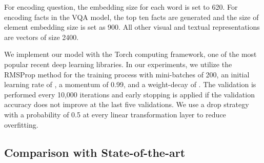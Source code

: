 \documentclass[sigconf]{acmart}
\begin{document}
For encoding question, the embedding size for each word is set to 620. For encoding facts in the VQA model, the top ten facts are generated and the size of element embedding size  is set as 900.  All other visual and textual representations are vectors of size 2400.





We implement our model with the Torch computing framework, one of the most popular recent deep learning libraries. In our experiments, we utilize the RMSProp method for the training process with mini-batches of 200, an initial learning rate of , a momentum of 0.99, and a weight-decay of . The validation is performed every 10,000 iterations and early stopping is applied if the validation accuracy does not improve at the last five validations. We use a drop strategy with a probability of 0.5 at every linear transformation layer to reduce overfitting.


\subsection{Comparison with State-of-the-art}
\end{document}
